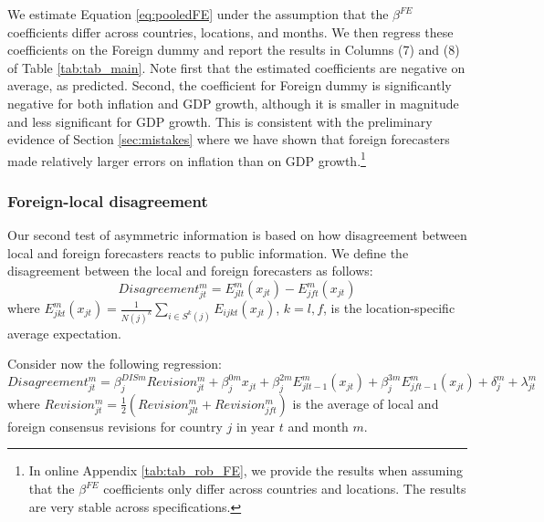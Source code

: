 We estimate Equation \eqref{eq:pooledFE} under the assumption that the $\beta^{FE}$ coefficients differ across countries, locations, and months. We then regress these coefficients on the Foreign dummy and report the results in Columns (7) and (8) of Table \ref{tab:tab_main}. Note first that the estimated coefficients are negative on average, as predicted. Second, the coefficient for Foreign dummy is significantly negative for both inflation and GDP growth, although it is smaller in magnitude and less significant for GDP growth. This is consistent with the preliminary evidence of Section \ref{sec:mistakes} where we have shown that foreign forecasters made relatively larger errors on inflation than on GDP growth.\footnote{In online Appendix \ref{tab:tab_rob_FE}, we provide the results when assuming that the $\beta^{FE}$ coefficients only differ across countries and locations. The results are very stable across specifications.}

\subsubsection{Foreign-local disagreement}

Our second test of asymmetric information is based on how disagreement between local and foreign forecasters reacts to public information.
We define the disagreement between the local and foreign forecasters as follows:
\begin{equation}
Disagreement_{jt}^m=E_{jlt}^m(x_{jt})-E_{jft}^m(x_{jt})
\label{eq:dis}
\end{equation}
where $E_{jkt}^m(x_{jt})=\frac{1}{N(j)^k}\sum_{i\in\textit{S}^k(j)}E_{ijkt}(x_{jt})$, $k=l,f$, is the location-specific average expectation.

Consider now the following regression:
\begin{equation}Disagreement_{jt}^m=\beta^{DISm}_{j}Revision_{jt}^m+\beta^{0m}_{j}x_{jt}+\beta^{2m}_jE_{jlt-1}^m(x_{jt})+\beta^{3m}_jE_{jft-1}^m(x_{jt})+\delta_{j}^m+\lambda_{jt}^m\label{eq:disagreement}\end{equation}
where $Revision_{jt}^m=\frac{1}{2}(Revision_{jlt}^m+Revision_{jft}^m)$ is the average of local and foreign consensus revisions for country $j$ in year $t$ and month $m$.

